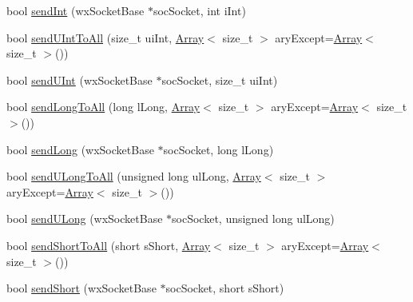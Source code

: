 \begin{DoxyCompactItemize}
\item 
bool \mbox{\hyperlink{class_rad_j_a_v_1_1_networking_1_1wx_widgets_t_c_p_server_a61087019c5c04e8f53f5ab72cacd4535}{send\+Int}} (wx\+Socket\+Base $\ast$soc\+Socket, int i\+Int)
\item 
bool \mbox{\hyperlink{class_rad_j_a_v_1_1_networking_1_1wx_widgets_t_c_p_server_ae5f1eb128e2895da1cc1f1015e08dfb4}{send\+U\+Int\+To\+All}} (size\+\_\+t ui\+Int, \mbox{\hyperlink{class_rad_j_a_v_1_1_array}{Array}}$<$ size\+\_\+t $>$ ary\+Except=\mbox{\hyperlink{class_rad_j_a_v_1_1_array}{Array}}$<$ size\+\_\+t $>$())
\item 
bool \mbox{\hyperlink{class_rad_j_a_v_1_1_networking_1_1wx_widgets_t_c_p_server_a1a7cfa0a5fc0b546b3606d0ee682db2a}{send\+U\+Int}} (wx\+Socket\+Base $\ast$soc\+Socket, size\+\_\+t ui\+Int)
\item 
bool \mbox{\hyperlink{class_rad_j_a_v_1_1_networking_1_1wx_widgets_t_c_p_server_a5f1f5d1adfdb67912afa5ef527766e1a}{send\+Long\+To\+All}} (long l\+Long, \mbox{\hyperlink{class_rad_j_a_v_1_1_array}{Array}}$<$ size\+\_\+t $>$ ary\+Except=\mbox{\hyperlink{class_rad_j_a_v_1_1_array}{Array}}$<$ size\+\_\+t $>$())
\item 
bool \mbox{\hyperlink{class_rad_j_a_v_1_1_networking_1_1wx_widgets_t_c_p_server_a82159c7ca10a3e5267936e8c02c8fbbc}{send\+Long}} (wx\+Socket\+Base $\ast$soc\+Socket, long l\+Long)
\item 
bool \mbox{\hyperlink{class_rad_j_a_v_1_1_networking_1_1wx_widgets_t_c_p_server_a07781e7fc1863045a08a2305ef26ff6c}{send\+U\+Long\+To\+All}} (unsigned long ul\+Long, \mbox{\hyperlink{class_rad_j_a_v_1_1_array}{Array}}$<$ size\+\_\+t $>$ ary\+Except=\mbox{\hyperlink{class_rad_j_a_v_1_1_array}{Array}}$<$ size\+\_\+t $>$())
\item 
bool \mbox{\hyperlink{class_rad_j_a_v_1_1_networking_1_1wx_widgets_t_c_p_server_a45d4749373218af45168ac52b9cb7881}{send\+U\+Long}} (wx\+Socket\+Base $\ast$soc\+Socket, unsigned long ul\+Long)
\item 
bool \mbox{\hyperlink{class_rad_j_a_v_1_1_networking_1_1wx_widgets_t_c_p_server_a501d55c3cf45c675ddb8b627c5066812}{send\+Short\+To\+All}} (short s\+Short, \mbox{\hyperlink{class_rad_j_a_v_1_1_array}{Array}}$<$ size\+\_\+t $>$ ary\+Except=\mbox{\hyperlink{class_rad_j_a_v_1_1_array}{Array}}$<$ size\+\_\+t $>$())
\item 
bool \mbox{\hyperlink{class_rad_j_a_v_1_1_networking_1_1wx_widgets_t_c_p_server_a109a7cfe9f0aed3c0ab385e22b7dccfc}{send\+Short}} (wx\+Socket\+Base $\ast$soc\+Socket, short s\+Short)

\end{DoxyCompactItemize}
